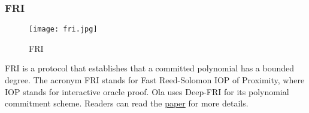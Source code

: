 \subsubsection{FRI}\label{section: starky-fri}

\begin{figure}[!htp]
    \centering
    \texttt{[image: fri.jpg]}
    \caption{FRI}
    \label{fig: FRI}
\end{figure}

FRI is a protocol that establishes that a committed polynomial has a bounded degree. The acronym FRI stands for Fast Reed-Solomon IOP of Proximity, where IOP stands for interactive oracle proof. Ola uses Deep-FRI for its polynomial commitment scheme. Readers can read the \href{https://arxiv.org/abs/1903.12243}{paper} for more details.